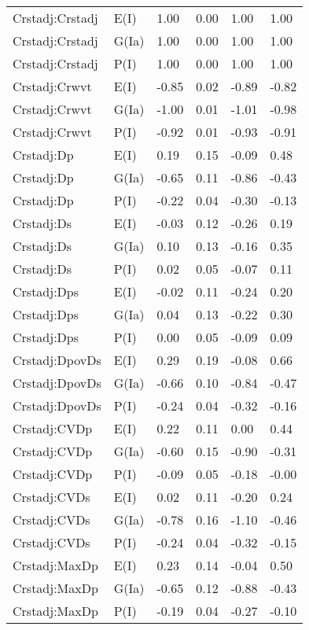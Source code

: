 \begin{center}
\begin{longtable}{|p{1.1in}|p{0.7in}|p{0.7in}|p{0.6in}|p{0.6in}|p{0.6in}|}
  Crstadj:Crstadj & E(I) & 1.00 & 0.00 & 1.00 & 1.00 \\ 
  Crstadj:Crstadj & G(Ia) & 1.00 & 0.00 & 1.00 & 1.00 \\ 
  Crstadj:Crstadj & P(I) & 1.00 & 0.00 & 1.00 & 1.00 \\ 
  Crstadj:Crwvt & E(I) & -0.85 & 0.02 & -0.89 & -0.82 \\ 
  Crstadj:Crwvt & G(Ia) & -1.00 & 0.01 & -1.01 & -0.98 \\ 
  Crstadj:Crwvt & P(I) & -0.92 & 0.01 & -0.93 & -0.91 \\ 
  Crstadj:Dp & E(I) & 0.19 & 0.15 & -0.09 & 0.48 \\ 
  Crstadj:Dp & G(Ia) & -0.65 & 0.11 & -0.86 & -0.43 \\ 
  Crstadj:Dp & P(I) & -0.22 & 0.04 & -0.30 & -0.13 \\ 
  Crstadj:Ds & E(I) & -0.03 & 0.12 & -0.26 & 0.19 \\ 
  Crstadj:Ds & G(Ia) & 0.10 & 0.13 & -0.16 & 0.35 \\ 
  Crstadj:Ds & P(I) & 0.02 & 0.05 & -0.07 & 0.11 \\ 
  Crstadj:Dps & E(I) & -0.02 & 0.11 & -0.24 & 0.20 \\ 
  Crstadj:Dps & G(Ia) & 0.04 & 0.13 & -0.22 & 0.30 \\ 
  Crstadj:Dps & P(I) & 0.00 & 0.05 & -0.09 & 0.09 \\ 
  Crstadj:DpovDs & E(I) & 0.29 & 0.19 & -0.08 & 0.66 \\ 
  Crstadj:DpovDs & G(Ia) & -0.66 & 0.10 & -0.84 & -0.47 \\ 
  Crstadj:DpovDs & P(I) & -0.24 & 0.04 & -0.32 & -0.16 \\ 
  Crstadj:CVDp & E(I) & 0.22 & 0.11 & 0.00 & 0.44 \\ 
  Crstadj:CVDp & G(Ia) & -0.60 & 0.15 & -0.90 & -0.31 \\ 
  Crstadj:CVDp & P(I) & -0.09 & 0.05 & -0.18 & -0.00 \\ 
  Crstadj:CVDs & E(I) & 0.02 & 0.11 & -0.20 & 0.24 \\ 
  Crstadj:CVDs & G(Ia) & -0.78 & 0.16 & -1.10 & -0.46 \\ 
  Crstadj:CVDs & P(I) & -0.24 & 0.04 & -0.32 & -0.15 \\ 
  Crstadj:MaxDp & E(I) & 0.23 & 0.14 & -0.04 & 0.50 \\ 
  Crstadj:MaxDp & G(Ia) & -0.65 & 0.12 & -0.88 & -0.43 \\ 
  Crstadj:MaxDp & P(I) & -0.19 & 0.04 & -0.27 & -0.10 \\ 

\end{longtable}
\end{center}
